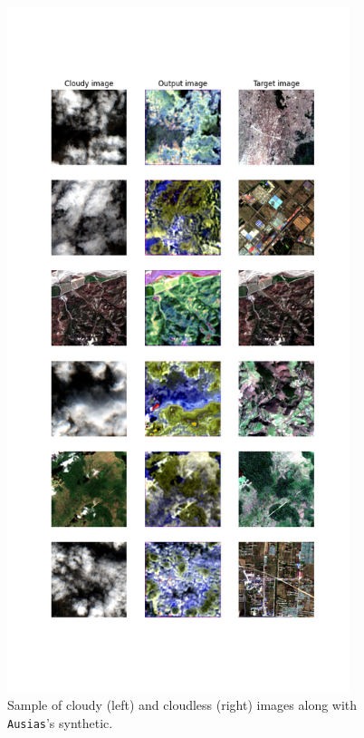 \begin{figure}[H]
	\centering
	\includegraphics[width=10cm]{imgs/models/models/ausias.png}
	\caption{Sample of cloudy (left) and cloudless (right) images along with \texttt{Ausias}'s synthetic.}
	\label{fig:models-carla-loss}
\end{figure}
